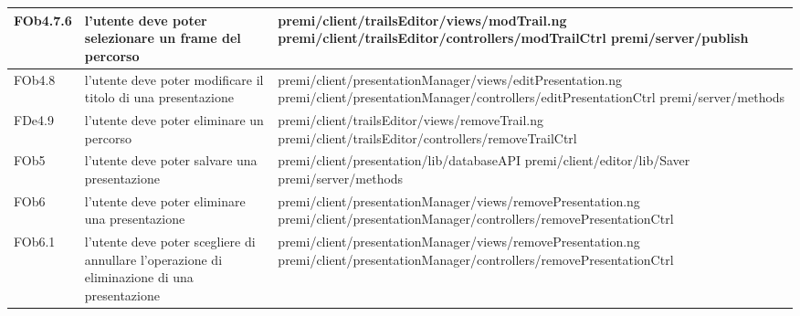 \begin{longtable}{|l|p{5cm}|p{7cm}|}
\hline
FOb4.7.6 & l'utente deve poter selezionare un frame del percorso & \hspace{0pt}premi/client/trailsEditor/views/modTrail.ng \linebreak \linebreak premi/client/trailsEditor/controllers/modTrailCtrl \linebreak \linebreak premi/server/publish \\
\hline
FOb4.8 & l'utente deve poter modificare il titolo di una presentazione & \hspace{0pt}premi/client/presentationManager/views/editPresentation.ng \linebreak \linebreak premi/client/presentationManager/controllers/editPresentationCtrl  \linebreak \linebreak premi/server/methods \\
\hline
FDe4.9 & l'utente deve poter eliminare un percorso & \hspace{0pt}premi/client/trailsEditor/views/removeTrail.ng \linebreak \linebreak premi/client/trailsEditor/controllers/removeTrailCtrl \\
\hline
FOb5 & l'utente deve poter salvare una presentazione & \hspace{0pt}premi/client/presentation/lib/databaseAPI \linebreak \linebreak premi/client/editor/lib/Saver \linebreak \linebreak premi/server/methods \\
\hline
FOb6 & l'utente deve poter eliminare una presentazione &  \hspace{0pt}premi/client/presentationManager/views/removePresentation.ng \linebreak \linebreak premi/client/presentationManager/controllers/removePresentationCtrl \\
\hline
FOb6.1 & l'utente deve poter scegliere di annullare l'operazione di eliminazione di una presentazione &  \hspace{0pt}premi/client/presentationManager/views/removePresentation.ng \linebreak \linebreak premi/client/presentationManager/controllers/removePresentationCtrl \\

\end{longtable}
